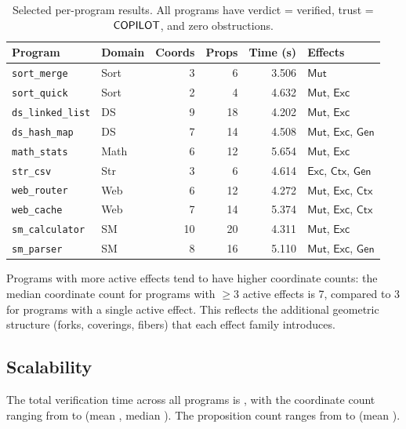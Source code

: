 \documentclass[11pt]{article}
\newcommand{\Exc}{\mathsf{Exc}}          %
\newcommand{\Mut}{\mathsf{Mut}}          %
\newcommand{\Gen}{\mathsf{Gen}}          %
\newcommand{\Ctx}{\mathsf{Ctx}}          %
\begin{document}
\begin{table}[H]
\centering
\caption{Selected per-program results.  All programs have
  verdict = verified, trust = $\mathsf{COPILOT}$, and zero
  obstructions.}\label{tab:selected}
\small
\begin{tabular}{@{}l l r r r l@{}}
\toprule
\textbf{Program} & \textbf{Domain} & \textbf{Coords}
  & \textbf{Props} & \textbf{Time (s)} & \textbf{Effects} \\
\midrule
\texttt{sort\_merge}    & Sort & 3 & 6   & 3.506 & $\Mut$ \\
\texttt{sort\_quick}    & Sort & 2 & 4   & 4.632 & $\Mut$, $\Exc$ \\
\texttt{ds\_linked\_list} & DS & 9 & 18  & 4.202 & $\Mut$, $\Exc$ \\
\texttt{ds\_hash\_map}  & DS   & 7 & 14  & 4.508 & $\Mut$, $\Exc$, $\Gen$ \\
\texttt{math\_stats}    & Math & 6 & 12  & 5.654 & $\Mut$, $\Exc$ \\
\texttt{str\_csv}       & Str  & 3 & 6   & 4.614 & $\Exc$, $\Ctx$, $\Gen$ \\
\texttt{web\_router}    & Web  & 6 & 12  & 4.272 & $\Mut$, $\Exc$, $\Ctx$ \\
\texttt{web\_cache}     & Web  & 7 & 14  & 5.374 & $\Mut$, $\Exc$, $\Ctx$ \\
\texttt{sm\_calculator} & SM   & 10 & 20 & 4.311 & $\Mut$, $\Exc$ \\
\texttt{sm\_parser}     & SM   & 8 & 16  & 5.110 & $\Mut$, $\Exc$, $\Gen$ \\
\bottomrule
\end{tabular}
\end{table}

Programs with more active effects tend to have higher coordinate
counts: the median coordinate count for programs with $\geq 3$ active
effects is 7, compared to 3 for programs with a single active effect.
This reflects the additional geometric structure (forks, coverings,
fibers) that each effect family introduces.

\subsection{Scalability}

The total verification time across all \expTotalPrograms{} programs is
\expTimeTotal{}, with the coordinate count ranging from \expCoordsMin{}
to \expCoordsMax{} (mean \expCoordsMean{}, median \expCoordsMedian{}).
The proposition count ranges from \expPropsMin{} to \expPropsMax{}
(mean \expPropsMean{}).
\end{document}
